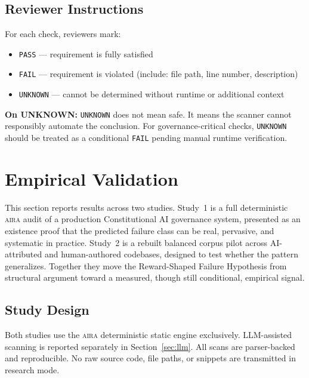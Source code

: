 \documentclass[11pt]{article}
\newcommand{\aira}{\textsc{aira}}
\begin{document}
\subsection{Reviewer Instructions}

For each check, reviewers mark:
\begin{itemize}
  \item \texttt{PASS} --- requirement is fully satisfied
  \item \texttt{FAIL} --- requirement is violated (include: file path, line number,
        description)
  \item \texttt{UNKNOWN} --- cannot be determined without runtime or additional context
\end{itemize}

\textbf{On UNKNOWN:} \texttt{UNKNOWN} does not mean safe. It means the scanner cannot
responsibly automate the conclusion. For governance-critical checks, \texttt{UNKNOWN} should
be treated as a conditional \texttt{FAIL} pending manual runtime verification.

\section{Empirical Validation}
\label{sec:empirical}

This section reports results across two studies. Study~1 is a full deterministic \aira{}
audit of a production Constitutional AI governance system, presented as an existence proof
that the predicted failure class can be real, pervasive, and systematic in practice.
Study~2 is a rebuilt balanced corpus pilot across AI-attributed and human-authored
codebases, designed to test whether the pattern generalizes. Together they move the
Reward-Shaped Failure Hypothesis from structural argument toward a measured, though still
conditional, empirical signal.

\subsection{Study Design}

Both studies use the \aira{} deterministic static engine exclusively. LLM-assisted scanning
is reported separately in Section~\ref{sec:llm}. All scans are parser-backed and reproducible.
No raw source code, file paths, or snippets are transmitted in research mode.
\end{document}
